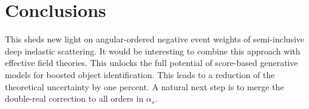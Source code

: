 \section{Conclusions}\label{sec:conclusions}

This sheds new light on angular-ordered negative event weights of
semi-inclusive deep inelastic scattering. It would be interesting to
combine this approach with effective field theories. This unlocks the
full potential of score-based generative models for boosted object
identification. This leads to a reduction of the theoretical uncertainty
by one percent. A natural next step is to merge the double-real
correction to all orders in $\alpha_s$.

